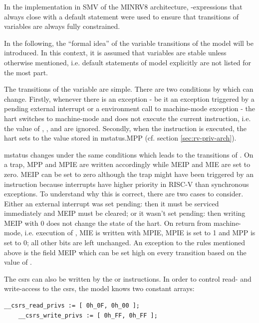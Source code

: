 In the implementation in SMV of the MINRV8 architecture, -expressions that always close with a default statement were used to ensure that transitions of variables are always fully constrained.

In the following, the \enquote{formal idea} of the variable transitions of the model will be introduced.
In this context, it is assumed that variables are stable unless otherwise mentioned, i.e. default statements of model explicitly are not listed for the most part.

The transitions of the  variable are simple.
There are two conditions by which  can change.
Firstly, whenever there is an exception - be it an exception triggered by a pending external interrupt or a environment call to machine-mode exception - the \gls{hart} switches to machine-mode and does not execute the current instruction, i.e. the value of , ,  and  are ignored.
Secondly, when the  instruction is executed, the \gls{hart} sets  to the value stored in \gls{mstatus}.MPP (cf. section \ref{sec:rv-priv-arch}).

\gls{mstatus} changes under the same conditions which leads to the transitions of .
On a trap, MPP and MPIE are written accordingly while MEIP and MIE are set to zero.
MEIP can be set to zero although the trap might have been triggered by an  instruction because interrupts have higher priority in RISC-V than synchronous exceptions.
To understand why this is correct, there are two cases to consider.
Either an external interrupt was set pending: then it must be serviced immediately and MEIP must be cleared; or it wasn't set pending: then writing MEIP with 0 does not change the state of the \gls{hart}.
On return from machine-mode, i.e. execution of , MIE is written with MPIE, MPIE is set to 1 and MPP is set to 0; all other bits are left unchanged.
An exception to the rules mentioned above is the field MEIP which can be set high on every transition based on the value of .

The \glspl{csr} can also be written by the  or  instructions.
In order to control read- and write-access to the \glspl{csr}, the model knows two constant arrays:
\begin{lstlisting}[language=smv]
    __csrs_read_privs := [ 0h_0F, 0h_00 ];
    __csrs_write_privs := [ 0h_FF, 0h_FF ];
\end{lstlisting}

